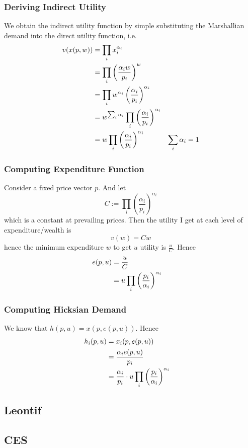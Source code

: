 \subsubsection{Deriving Indirect Utility}

We obtain the indirect utility function by simple substituting the
Marshallian demand into the direct utility function, i.e.
\begin{align}
  v(x(p, w)) & = \prod_i x_i^{\alpha_i} & \notag \\
  & = \prod_i \left(\frac{\alpha_i w}{p_i}\right)^w & \notag \\
  & = \prod_i w^{\alpha_i} \left(\frac{\alpha_i}{p_i}\right)^{\alpha_i} & \notag \\
  & = w^{\sum_i \alpha_i} \prod_i \left(\frac{\alpha_i}{p_i}\right)^{\alpha_i} & \notag \\
  & = w \prod_i \left(\frac{\alpha_i}{p_i}\right)^{\alpha_i} & \sum_i \alpha_i = 1 \notag 
\end{align}


\subsubsection{Computing Expenditure Function}

Consider a fixed price vector $p$. And let 
\[
C := \prod_i \left(\frac{\alpha_i}{p_i}\right)^{\alpha_i}
\]
which is a constant at prevailing prices. Then the utility I get at
each level of expenditure/wealth is
\[
v(w) = Cw
\]
hence the minimum expenditure $w$ to get $u$ utility is $\frac{u}{C}$. 
Hence 
\begin{align}
  e(p,u) & = \frac{u}{C} & \notag \\
  & = u \prod_i \left(\frac{p_i}{\alpha_i}\right)^{\alpha_i} & \notag
\end{align}



\subsubsection{Computing Hicksian Demand}

We know that $h(p, u) = x(p, e(p,u))$. Hence
\begin{align}
  h_i(p,u) & = x_i(p, e(p,u)) & \notag \\
  & = \frac{\alpha_i e(p, u)}{p_i} & \notag \\
  & = \frac{\alpha_i}{p_i} \cdot
  u \prod_i \left(\frac{p_i}{\alpha_i}\right)^{\alpha_i} & \notag
\end{align}

\subsection{Leontif}
\label{sec:leontif}


\subsection{CES}
\label{sec:ces}


